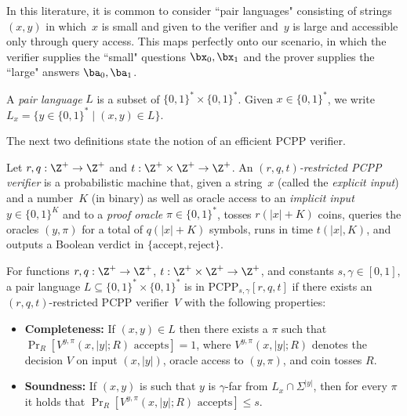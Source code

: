 \documentclass[11pt]{article}
\begin{document}
In this literature, it is common to consider ``pair languages" consisting of strings $(x, y)$
in which~$x$ is small and given to the verifier and~$y$ is large and accessible only through query access.
This maps perfectly onto our scenario,
in which the verifier supplies the ``small" questions $\bx_0, \bx_1$
and the prover supplies the ``large" answers $\ba_0, \ba_1$.

\begin{definition}
A \emph{pair language} $L$ is a subset of $\{0, 1\}^* \times \{0, 1\}^*$.
Given $x \in \{0, 1\}^*$, we write $L_x = \{y \in \{0, 1\}^* \mid (x,y) \in L\}$.
\end{definition}

The next two definitions state the notion of an efficient PCPP verifier.

\begin{definition}
Let $r, q:\Z^+ \rightarrow \Z^+$ and $t:\Z^+ \times \Z^+ \rightarrow \Z^+$.
An \emph{$(r, q, t)$-restricted PCPP verifier} is a probabilistic machine that, given a string~$x$ (called the \emph{explicit input})
and a number~$K$ (in binary) as well as oracle access to an \emph{implicit input} $y \in \{0, 1\}^{K}$ and to a \emph{proof oracle} $\pi \in \{0, 1\}^*$,
tosses $r(|x|+K)$ coins, queries the oracles $(y, \pi)$ for a total of $q(|x|+K)$ symbols,
runs in time $t(|x|, K)$, and outputs a Boolean verdict in $\{\mathrm{accept}, \mathrm{reject}\}$.
\end{definition}

\begin{definition}
For functions $r, q:\Z^+ \rightarrow \Z^+$, $t:\Z^+\times \Z^+ \rightarrow \Z^+$,
and constants
$s, \gamma \in  [0, 1]$,
a pair language $L \subseteq \{0, 1\}^* \times \{0, 1\}^*$ is in $\mathrm{PCPP}_{s, \gamma}[r, q, t]$
if there exists an $(r, q, t)$-restricted PCPP verifier~$V$ with the following properties:
\begin{itemize}
\item[$\circ$] \textbf{Completeness:} If $(x, y) \in L$ then there exists a $\pi$ such that $\Pr_R[\text{$V^{y, \pi}(x, |y|; R)$ accepts}] = 1$,
	where $V^{y, \pi}(x, |y|; R)$ denotes the decision $V$ on input $(x, |y|)$,
	oracle access to $(y, \pi)$, and coin tosses $R$.
\item[$\circ$] \textbf{Soundness:} If $(x, y)$ is such that $y$ is $\gamma$-far from $L_x \cap \Sigma^{|y|}$,
	then for every $\pi$ it holds that $\Pr_R[\text{$V^{y, \pi}(x, |y|;R)$ accepts}] \leq s$.
\end{itemize}
\end{definition}
\end{document}
